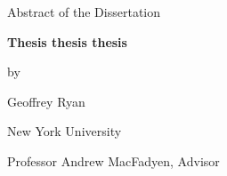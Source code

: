 \documentclass[12pt,letterpaper]{article}
\newcommand{\thesistitle}{Thesis thesis thesis}
\newcommand{\thesisauthor}{Geoffrey Ryan}
\newcommand{\thesisadvisor}{Professor Andrew MacFadyen}
\begin{document}
  \begin{center}
    Abstract of the Dissertation\bigskip

    \textbf{\thesistitle}\bigskip

    by\bigskip

    \thesisauthor\bigskip

    New York University\bigskip

    \thesisadvisor, Advisor
  \end{center}
\bigskip


\end{document}
